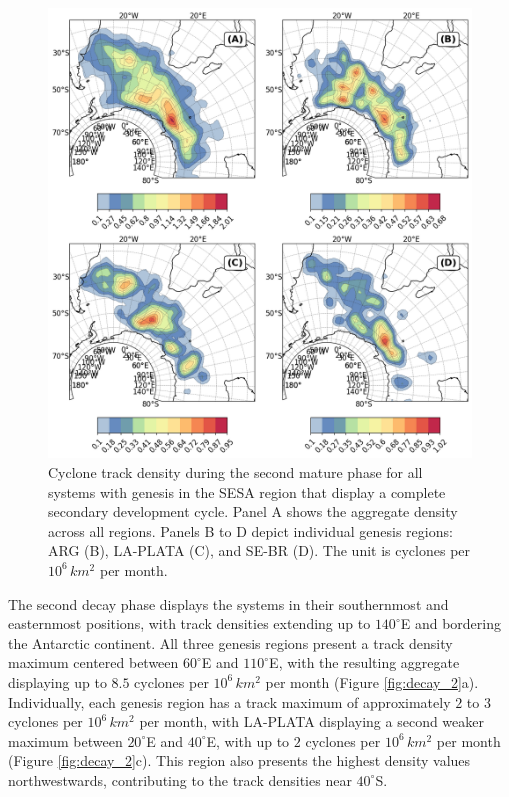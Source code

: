 \begin{figure}[!htbp]
\centering
\includegraphics[width=\textwidth]{figs_4/density_map_mature 2_regions_secondary.png}
\caption[Track Density - Mature 2]{Cyclone track density during the second mature phase for all systems with genesis in the SESA region that display a complete secondary development cycle. Panel A shows the aggregate density across all regions. Panels B to D depict individual genesis regions: ARG (B), LA-PLATA (C), and SE-BR (D). The unit is cyclones per \(10^6 \, km^2\) per month.}
\label{fig:mature_2}
\end{figure}

The second decay phase displays the systems in their southernmost and easternmost positions, with track densities extending up to \(140^\circ\)E and bordering the Antarctic continent. All three genesis regions present a track density maximum centered between \(60^\circ\)E and \(110^\circ\)E, with the resulting aggregate displaying up to \(8.5\) cyclones per \(10^6 \, km^2\) per month (Figure \ref{fig:decay_2}a). Individually, each genesis region has a track maximum of approximately \(2\) to \(3\) cyclones per \(10^6 \, km^2\) per month, with LA-PLATA displaying a second weaker maximum between \(20^\circ\)E and \(40^\circ\)E, with up to \(2\) cyclones per \(10^6 \, km^2\) per month (Figure \ref{fig:decay_2}c). This region also presents the highest density values northwestwards, contributing to the track densities near \(40^\circ\)S.


